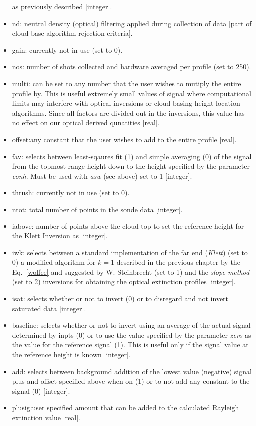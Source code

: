 \begin{itemize}
as previously described [integer].
\item nd: neutral density (optical) filtering applied during collection
    of data [part of cloud base algorithm rejection criteria].
\item gain: currently not in use (set to 0).
\item nos: number of shots collected and hardware averaged per profile
(set to 250).
\item multi: can be set to any number that the user wishes to
mutiply the entire profile by. This is useful 
extremely small values of signal where computational
limits may interfere with optical inversions or cloud
basing height location algorithms. Since all factors are divided out
in the inversions, this value has no effect on our
optical derived qunatities [real].
\item offset:any constant that the user wishes to add to the entire 
profile [real].
\item fav: selects between least-sqaures fit (1) and simple averaging (0)
of the signal from the topmost range height down to the 
height specified by the parameter {\em conh}. 
Must be used with {\em asw} (see above) set to 1 [integer].
\item thrush: currently not in use (set to 0).
\item ntot: total number of points in the sonde data [integer].
\item iabove: number of points above the cloud top to set the 
reference height for the Klett Inversion as [integer].
\item iwk: selects between a standard implementation of the far end ({\em Klett}) 
(set to 0) a modified algorithm for $k=1$ described in the previous
chapter by the Eq.~{\ref{wolfee}} and suggested by W. Steinbrecht (set to 1)
and the {\em slope method} (set to 2) inversions for obtaining the
optical extinction profiles [integer].
\item isat: selects whether or not to invert (0) or to disregard and not
invert saturated data [integer].
\item baseline: selects whether or not to invert using an average of 
the actual signal determined by inpts (0) or to 
use the value specified by the parameter {\em zero}  as the value
for the reference signal (1). This is useful only if the signal value
at the reference height is known [integer].
\item add: selects between background addition of the lowest value (negative)
signal plus and offset specified above when on (1) or to not add
any constant to the signal (0) [integer].
\item plusig:user specified amount that can be added to the calculated Rayleigh
extinction value [real].
\end{itemize}

